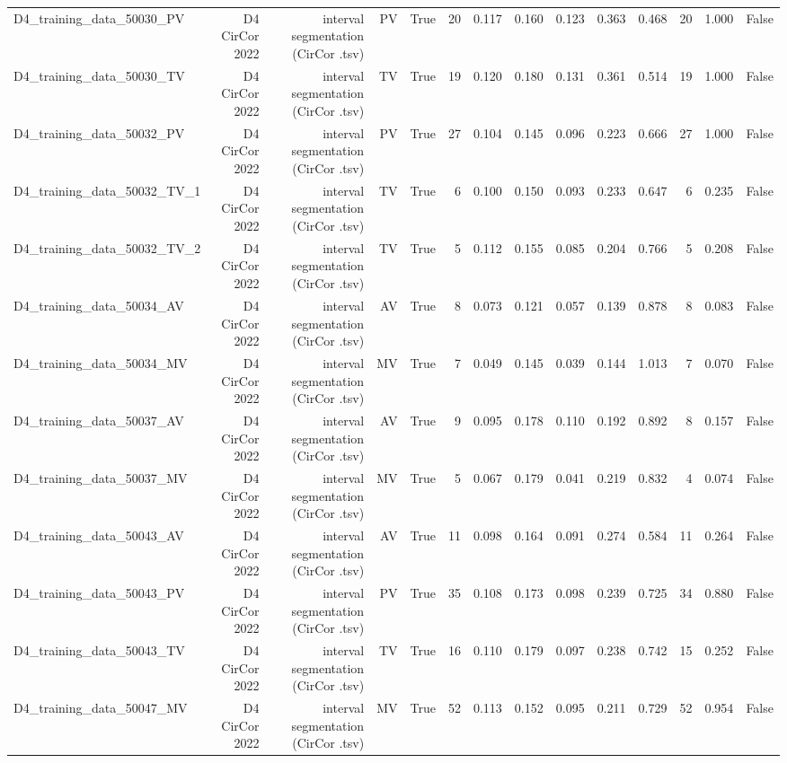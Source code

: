 \begin{table}[htbp]
\begin{tabular}{lrrrrrrrrrrrrr}
    D4\_training\_data\_50030\_PV & D4 CirCor 2022 & interval segmentation (CirCor .tsv) & PV & True & 20 & 0.117 & 0.160 & 0.123 & 0.363 & 0.468 & 20 & 1.000 & False \\
    D4\_training\_data\_50030\_TV & D4 CirCor 2022 & interval segmentation (CirCor .tsv) & TV & True & 19 & 0.120 & 0.180 & 0.131 & 0.361 & 0.514 & 19 & 1.000 & False \\
    D4\_training\_data\_50032\_PV & D4 CirCor 2022 & interval segmentation (CirCor .tsv) & PV & True & 27 & 0.104 & 0.145 & 0.096 & 0.223 & 0.666 & 27 & 1.000 & False \\
    D4\_training\_data\_50032\_TV\_1 & D4 CirCor 2022 & interval segmentation (CirCor .tsv) & TV & True & 6 & 0.100 & 0.150 & 0.093 & 0.233 & 0.647 & 6 & 0.235 & False \\
    D4\_training\_data\_50032\_TV\_2 & D4 CirCor 2022 & interval segmentation (CirCor .tsv) & TV & True & 5 & 0.112 & 0.155 & 0.085 & 0.204 & 0.766 & 5 & 0.208 & False \\
    D4\_training\_data\_50034\_AV & D4 CirCor 2022 & interval segmentation (CirCor .tsv) & AV & True & 8 & 0.073 & 0.121 & 0.057 & 0.139 & 0.878 & 8 & 0.083 & False \\
    D4\_training\_data\_50034\_MV & D4 CirCor 2022 & interval segmentation (CirCor .tsv) & MV & True & 7 & 0.049 & 0.145 & 0.039 & 0.144 & 1.013 & 7 & 0.070 & False \\
    D4\_training\_data\_50037\_AV & D4 CirCor 2022 & interval segmentation (CirCor .tsv) & AV & True & 9 & 0.095 & 0.178 & 0.110 & 0.192 & 0.892 & 8 & 0.157 & False \\
    D4\_training\_data\_50037\_MV & D4 CirCor 2022 & interval segmentation (CirCor .tsv) & MV & True & 5 & 0.067 & 0.179 & 0.041 & 0.219 & 0.832 & 4 & 0.074 & False \\
    D4\_training\_data\_50043\_AV & D4 CirCor 2022 & interval segmentation (CirCor .tsv) & AV & True & 11 & 0.098 & 0.164 & 0.091 & 0.274 & 0.584 & 11 & 0.264 & False \\
    D4\_training\_data\_50043\_PV & D4 CirCor 2022 & interval segmentation (CirCor .tsv) & PV & True & 35 & 0.108 & 0.173 & 0.098 & 0.239 & 0.725 & 34 & 0.880 & False \\
    D4\_training\_data\_50043\_TV & D4 CirCor 2022 & interval segmentation (CirCor .tsv) & TV & True & 16 & 0.110 & 0.179 & 0.097 & 0.238 & 0.742 & 15 & 0.252 & False \\
    D4\_training\_data\_50047\_MV & D4 CirCor 2022 & interval segmentation (CirCor .tsv) & MV & True & 52 & 0.113 & 0.152 & 0.095 & 0.211 & 0.729 & 52 & 0.954 & False \\

\end{tabular}
\end{table}
